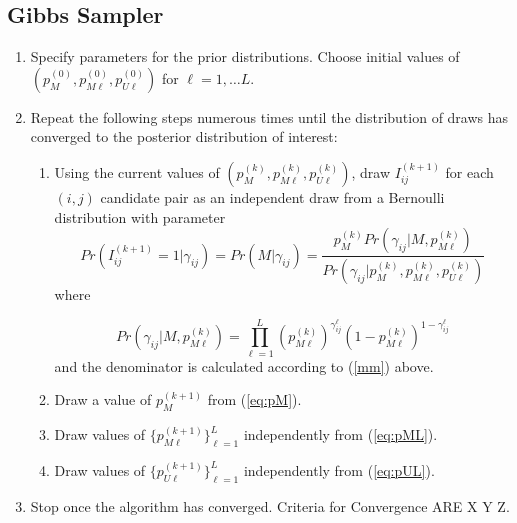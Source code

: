 \documentclass[11pt,reqno]{amsart}
\begin{document}
\subsection{Gibbs Sampler \citep{larsen_2005}}
\label{app:simple_gibbs}
\begin{enumerate}
\item Specify parameters for the prior distributions.  Choose initial values of $\left(p_M^{(0)}, p_{M\ell}^{(0)}, p_{U\ell}^{(0)}\right)$ for $\ell=1,\dots L$.  

\item Repeat the following steps numerous times until the distribution of draws has converged to the posterior distribution of interest:
\begin{enumerate}

\item Using the current values of $\left(p_M^{(k)}, p_{M\ell}^{(k)}, p_{U\ell}^{(k)}\right)$, draw $I_{ij}^{(k+1)}$ for each $(i,j)$ candidate pair as an independent draw from a Bernoulli distribution with parameter
\begin{equation}
Pr\left( I_{ij}^{(k+1)}=1 \Big| \gamma_{ij}\right) = Pr\left(M | \gamma_{ij}\right) = \frac{p_M^{(k)}Pr\left(\gamma_{ij} | M, p_{M\ell}^{(k)} \right)}{Pr\left(\gamma_{ij} \Big | p_M^{(k)}, p_{M\ell}^{(k)}, p_{U\ell}^{(k)}\right)}
\end{equation} where 

$$ Pr\left(\gamma_{ij} | M, p_{M\ell}^{(k)} \right) = \prod_{\ell=1}^L  \left(p_{M\ell}^{(k)}\right)^{\gamma_{ij}^{\ell}}\left(1-p_{M\ell}^{(k)}\right)^{1-\gamma_{ij}^{\ell}}$$ and the denominator is calculated according to (\ref{mm}) above. 
\item Draw a value of $p_M^{(k+1)}$ from (\ref{eq:pM}).
\item Draw values of $\{p_{M\ell}^{(k+1)}\}_{\ell=1}^L$ independently from (\ref{eq:pML}). 
\item Draw values of $\{p_{U\ell}^{(k+1)}\}_{\ell=1}^L$ independently from (\ref{eq:pUL}). 
\end{enumerate}
\item Stop once the algorithm has converged.  Criteria for Convergence ARE X Y Z. %
\end{enumerate}
\end{document}
